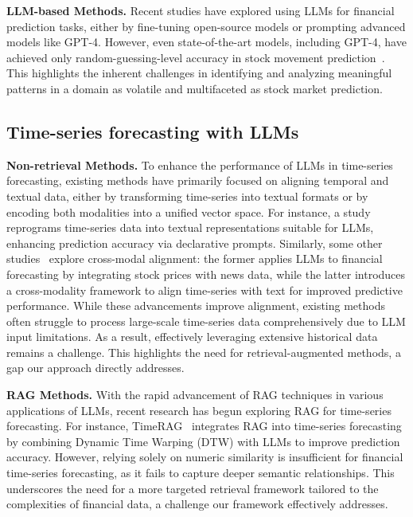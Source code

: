\noindent
\textbf{LLM-based Methods.}
Recent studies have explored using LLMs for financial prediction tasks, either by fine-tuning open-source models or prompting advanced models like GPT-4. However, even state-of-the-art models, including GPT-4, have achieved only random-guessing-level accuracy in stock movement prediction~\citep{xie2023pixiu,xie2024finben,xie2023wall}. This highlights the inherent challenges in identifying and analyzing meaningful patterns in a domain as volatile and multifaceted as stock market prediction.

\subsection{Time-series forecasting with LLMs}
\textbf{Non-retrieval Methods.}
To enhance the performance of LLMs in time-series forecasting, existing methods have primarily focused on aligning temporal and textual data, either by transforming time-series into textual formats or by encoding both modalities into a unified vector space.
For instance, a study~\citep{jin2023time} reprograms time-series data into textual representations suitable for LLMs, enhancing prediction accuracy via declarative prompts. Similarly, some other studies~\citep{yu2023temporal,liu2024timecma} explore cross-modal alignment: the former applies LLMs to financial forecasting by integrating stock prices with news data, while the latter introduces a cross-modality framework to align time-series with text for improved predictive performance. %
While these advancements improve alignment, existing methods often struggle to process large-scale time-series data comprehensively due to LLM input limitations. As a result, effectively leveraging extensive historical data remains a challenge. This highlights the need for retrieval-augmented methods, a gap our approach directly addresses.

\noindent
\textbf{RAG Methods.}
With the rapid advancement of RAG techniques in various applications of LLMs, recent research has begun exploring RAG for time-series forecasting. For instance, TimeRAG~\citep{yang2024timerag} integrates RAG into time-series forecasting by combining Dynamic Time Warping (DTW) with LLMs to improve prediction accuracy. However, relying solely on numeric similarity is insufficient for financial time-series forecasting, as it fails to capture deeper semantic relationships. This underscores the need for a more targeted retrieval framework tailored to the complexities of financial data, a challenge our framework effectively addresses.